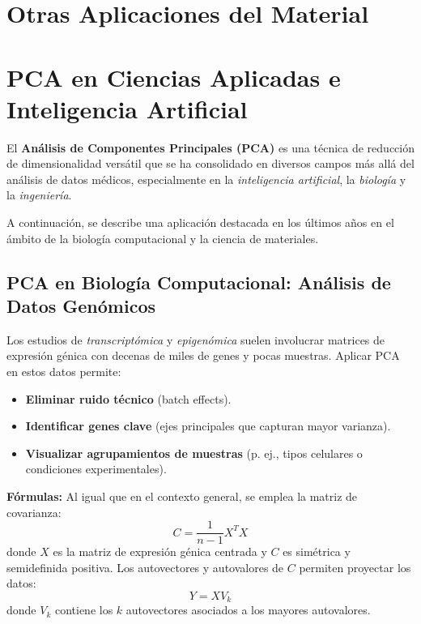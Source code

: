 \documentclass[12pt]{article}
\begin{document}
\newpage
\section{Otras Aplicaciones del Material}

\section*{PCA en Ciencias Aplicadas e Inteligencia Artificial}

\noindent
El \textbf{Análisis de Componentes Principales (PCA)} es una técnica de reducción de dimensionalidad versátil que se ha consolidado en diversos campos más allá del análisis de datos médicos, especialmente en la \emph{inteligencia artificial}, la \emph{biología} y la \emph{ingeniería}.

\vspace{1em}
\noindent
A continuación, se describe una aplicación destacada en los últimos años en el ámbito de la biología computacional y la ciencia de materiales.

\subsection*{PCA en Biología Computacional: Análisis de Datos Genómicos}

\noindent
Los estudios de \emph{transcriptómica} y \emph{epigenómica} suelen involucrar matrices de expresión génica con decenas de miles de genes y pocas muestras. Aplicar PCA en estos datos permite:

\begin{itemize}
	\item \textbf{Eliminar ruido técnico} (batch effects).
	\item \textbf{Identificar genes clave} (ejes principales que capturan mayor varianza).
	\item \textbf{Visualizar agrupamientos de muestras} (p. ej., tipos celulares o condiciones experimentales).
\end{itemize}

\vspace{1em}
\noindent
\textbf{Fórmulas:} Al igual que en el contexto general, se emplea la matriz de covarianza:
\[
C = \frac{1}{n-1} X^T X
\]
donde \( X \) es la matriz de expresión génica centrada y \( C \) es simétrica y semidefinida positiva. Los autovectores y autovalores de \( C \) permiten proyectar los datos:
\[
Y = X V_k
\]
donde \( V_k \) contiene los \( k \) autovectores asociados a los mayores autovalores.
\end{document}
